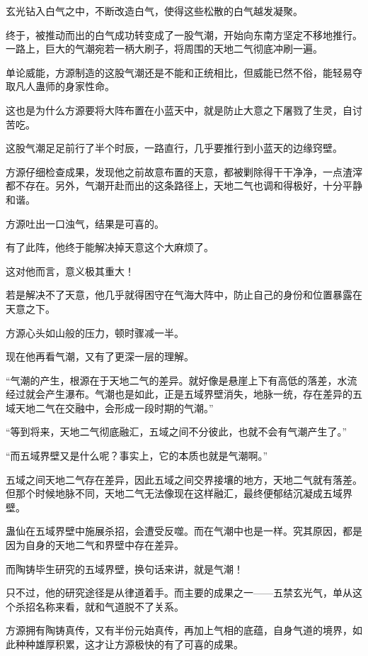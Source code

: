 \begin{this_body}
玄光钻入白气之中，不断改造白气，使得这些松散的白气越发凝聚。

终于，被推动而出的白气成功转变成了一股气潮，开始向东南方坚定不移地推行。一路上，巨大的气潮宛若一柄大刷子，将周围的天地二气彻底冲刷一遍。

单论威能，方源制造的这股气潮还是不能和正统相比，但威能已然不俗，能轻易夺取凡人蛊师的身家性命。

这也是为什么方源要将大阵布置在小蓝天中，就是防止大意之下屠戮了生灵，自讨苦吃。

这股气潮足足前行了半个时辰，一路直行，几乎要推行到小蓝天的边缘窍壁。

方源仔细检查成果，发现他之前故意布置的天意，都被剿除得干干净净，一点渣滓都不存在。另外，气潮开赴而出的这条路径上，天地二气也调和得极好，十分平静和谐。

方源吐出一口浊气，结果是可喜的。

有了此阵，他终于能解决掉天意这个大麻烦了。

这对他而言，意义极其重大！

若是解决不了天意，他几乎就得困守在气海大阵中，防止自己的身份和位置暴露在天意之下。

方源心头如山般的压力，顿时骤减一半。

现在他再看气潮，又有了更深一层的理解。

“气潮的产生，根源在于天地二气的差异。就好像是悬崖上下有高低的落差，水流经过就会产生瀑布。气潮也是如此，正是五域界壁消失，地脉一统，存在差异的五域天地二气在交融中，会形成一段时期的气潮。”

“等到将来，天地二气彻底融汇，五域之间不分彼此，也就不会有气潮产生了。”

“而五域界壁又是什么呢？事实上，它的本质也就是气潮啊。”

五域之间天地二气存在差异，因此五域之间交界接壤的地方，天地二气就有落差。但那个时候地脉不同，天地二气无法像现在这样融汇，最终便郁结沉凝成五域界壁。

蛊仙在五域界壁中施展杀招，会遭受反噬。而在气潮中也是一样。究其原因，都是因为自身的天地二气和界壁中存在差异。

而陶铸毕生研究的五域界壁，换句话来讲，就是气潮！

只不过，他的研究途径是从律道着手。而主要的成果之一——五禁玄光气，单从这个杀招名称来看，就和气道脱不了关系。

方源拥有陶铸真传，又有半份元始真传，再加上气相的底蕴，自身气道的境界，如此种种雄厚积累，这才让方源极快的有了可喜的成果。


\end{this_body}
